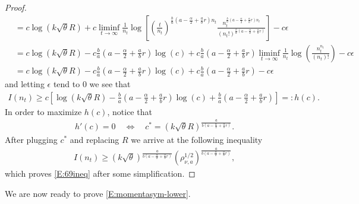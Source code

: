 \documentclass[a4paper,11pt]{article}
\numberwithin{equation}{section}
\numberwithin{equation}{section}
\theoremstyle{plain}
\theoremstyle{definition}
\begin{document}
\begin{proof}
\begin{align*}
           & = c \log(k \sqrt{\theta}R) + c \liminf_{t \to \infty} \frac{1}{n_t} \log \left[  \left(\frac{t}{n_t}\right)^{\frac{b}{a}\left(a-\frac{\alpha}{2} + \frac{a}{b}r\right)n_t} \frac{ n_t^{\frac{b}{a}\left( a- \frac{\alpha}{2} + \frac{a}{b}r \right)n_t } } { (n_t!)^{\frac{b}{a}\left( a - \frac{\alpha}{2} + \frac{a}{b}r \right) } }\right] - c \epsilon \\
           & = c \log(k \sqrt{\theta}R) - c\frac{b}{a}\left( a - \frac{\alpha}{2} + \frac{a}{b}r \right) \log(c) + c\frac{b}{a}\left( a - \frac{\alpha}{2} + \frac{a}{b}r \right) \liminf_{t \to \infty} \frac{1}{n_t}\log\left(\frac{n_t^{n_t}}{(n_t)!}\right) - c\epsilon                                                                                             \\
           & = c \log(k \sqrt{\theta}R) - c\frac{b}{a}\left( a - \frac{\alpha}{2} + \frac{a}{b}r \right) \log(c) + c\frac{b}{a}\left( a - \frac{\alpha}{2} + \frac{a}{b}r \right)  - c\epsilon
  \end{align*}
  and letting $\epsilon$ tend to $0$ we see that
  \begin{align*}
    I(n_t) \ge c \left[ \log(k \sqrt{\theta}R) - \frac{b}{a}\left( a - \frac{\alpha}{2} + \frac{a}{b}r \right) \log(c) + \frac{b}{a}\left( a - \frac{\alpha}{2} + \frac{a}{b}r \right) \right] =: h(c).
  \end{align*}
  In order to maximize $h(c)$, notice that
  \begin{align*}
    h'(c) = 0 \quad \Longleftrightarrow  \quad  c^*=(k \sqrt{\theta}R)^{\frac{a}{b\left( a - \frac{\alpha}{2} + \frac{a}{b}r \right)}}.
  \end{align*}
  After plugging $c^*$ and replacing $R$ we arrive at the following inequality
  \begin{align*}
    I(n_t) \ge (k\sqrt{\theta})^{\frac{a}{b\left( a - \frac{\alpha}{2} + \frac{a}{b}r \right)} }(\rho_{\nu,a}^{1/2})^{\frac{a}{b\left( a - \frac{\alpha}{2} + \frac{a}{b}r \right)}},
  \end{align*}
  which proves \eqref{E:69ineq} after some simplification.
\end{proof}


We are now ready to prove \eqref{E:momentasym-lower}.
\end{document}
